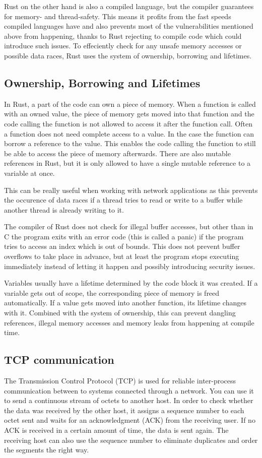 Rust on the other hand is also a compiled language, but the compiler guarantees for memory- and thread-safety. This
means it profits from the fast speeds compiled languages have and also prevents most of the vulnerabilities mentioned
above from happening, thanks to Rust rejecting to compile code which could introduce such issues. To effeciently check
for any unsafe memory accesses or possible data races, Rust uses the system of ownership, borrowing and lifetimes.

\subsection{Ownership, Borrowing and Lifetimes}
In Rust, a part of the code can own a piece of memory. When a function is called with an owned value, the piece of
memory gets moved into that function and the code calling the function is not allowed to access it after the function
call. Often a function does not need complete access to a value. In the case the function can borrow a reference to the
value. This enables the code calling the function to still be able to access the piece of memory afterwards.
There are also mutable references in Rust, but it is only allowed to have a single mutable reference to a variable at
once.

This can be really useful when working with network applications as this prevents the occurence of data races if a
thread tries to read or write to a buffer while another thread is already writing to it.

The compiler of Rust does not check for illegal buffer accesses, but other than in C the program exits with an error
code (this is called a panic) if the program tries to access an index which is out of bounds. This does not prevent
buffer overflows to take place in advance, but at least the program stops executing immediately instead of letting it
happen and possibly introducing security issues.

Variables usually have a lifetime determined by the code block it was created. If a variable gets out of scope, the
corresponding piece of memory is freed automatically. If a value gets moved into another function, its lifetime changes
with it. Combined with the system of ownership, this can prevent dangling references, illegal memory accesses and
memory leaks from happening at compile time. \cite{c15safe}

\subsection{TCP communication}
The Transmission Control Protocol (TCP) is used for reliable inter-process communication between to systems connected
through a network. You can use it to send a continuous stream of octets to another host. In order to check whether the
data was received by the other host, it assigns a sequence number to each octet sent and waits for an acknowledgment
(ACK) from the receiving user. If no ACK is received in a certain amount of time, the data is sent again. The receiving
host can also use the sequence number to eliminate duplicates and order the segments the right way. \cite{rfc793}

